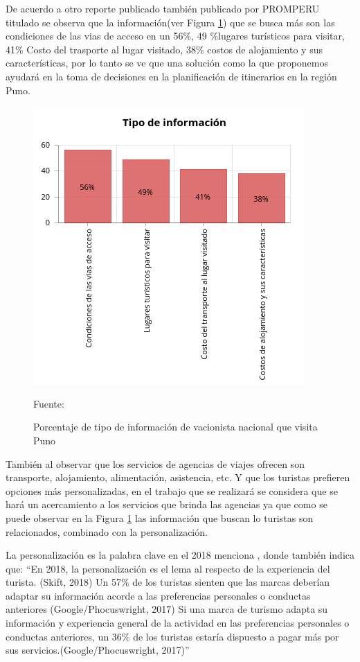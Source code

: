 De acuerdo a otro reporte publicado también publicado por PROMPERU titulado \cite{2017PerfilNacional} se observa que la información(ver Figura \ref{fig:tipo_infomacion_nacional}) que se busca más son las condiciones de las vias de acceso en un 56\%, 49 \%lugares turísticos para visitar, 41\% Costo del trasporte al lugar visitado, 38\% costos de alojamiento y sus características, por lo tanto se ve que una solución como la que proponemos ayudará en la toma de decisiones en la planificación de itinerarios en la región Puno.

\begin{figure}[!ht]
    \centering
    \includegraphics[scale=0.7]{Capitulo2/Figs/tipo_informacion_nacional.jpg}
    \caption{Porcentaje de tipo de información de vacionista nacional que visita Puno}
    Fuente: 
    \label{fig:tipo_infomacion_nacional}
\end{figure}

También al observar que los servicios de agencias de viajes ofrecen son transporte, alojamiento, alimentación, asistencia, etc. Y que los turistas prefieren opciones más personalizadas, en el trabajo que se realizará se considera que se hará un acercamiento a los servicios que brinda las agencias ya que como se puede observar en la Figura \ref{fig:tipo_infomacion_nacional} las información que buscan lo turistas son relacionados, combinado con la personalización.

La personalización es la palabra clave en el 2018 menciona  , donde también indica que:
“En 2018, la personalización es el lema al respecto de la experiencia del turista. (Skift, 2018)
Un 57\% de los turistas sienten que las marcas deberían adaptar su información acorde a las preferencias personales o conductas anteriores (Google/Phocuswright, 2017)
Si una marca de turismo adapta su información y experiencia general de la actividad en las preferencias personales o conductas anteriores, un 36\% de los turistas estaría dispuesto a pagar más por sus servicios.(Google/Phocuswright, 2017)”